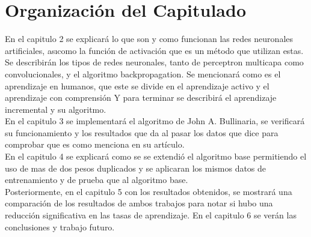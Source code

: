 
\section{Organización del Capitulado}


	En el capitulo 2 se explicar\'a lo que son y como funcionan las redes neuronales artificiales, as\i como la función de activación que es un método que utilizan estas.
	 Se describir\'an los tipos de redes neuronales, tanto de perceptron multicapa como convolucionales, y el algoritmo backpropagation.
	 Se mencionar\'a como es el aprendizaje en humanos, que este se divide en el aprendizaje activo y el aprendizaje con comprensión
	 Y para terminar se describirá el aprendizaje incremental y su algoritmo.\\
	 
	 En el capitulo 3 se implementar\'a el algoritmo de John A. Bullinaria, se verificar\'a su funcionamiento y los resultados que da al pasar los datos que dice para comprobar que es como menciona en su art\'iculo.\\
	 En el capitulo 4 se explicar\'a como se se extendió el algoritmo base permitiendo el uso de mas de dos pesos duplicados y se aplicaran los mismos datos de entrenamiento y de prueba que al algoritmo base.\\
	 
	 Posteriormente, en el capitulo 5 con los resultados obtenidos, se mostrar\'a una comparación de los resultados de ambos trabajos para notar si hubo una reducción significativa en las tasas de aprendizaje. En el capitulo 6 se verán las conclusiones y trabajo futuro.